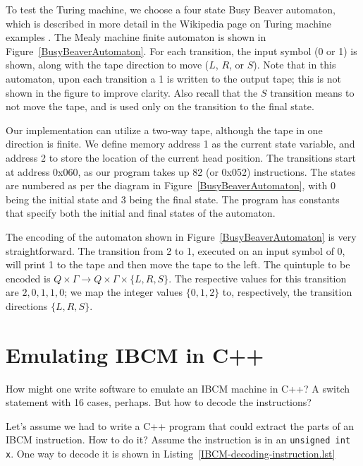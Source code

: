 To test the Turing machine, we choose a four state Busy Beaver
automaton, which is described in more detail in the Wikipedia page on
Turing machine examples \cite{wikipedia:turingmachineexamples}.  The
Mea\-ly machine finite automaton is shown in
Figure~\ref{BusyBeaverAutomaton}.  For each transition, the input
symbol (0 or 1) is shown, along with the tape direction to move ($L$,
$R$, or $S$).  Note that in this automaton, upon each transition a 1
is written to the output tape; this is not shown in the figure to
improve clarity.  Also recall that the $S$
transition means to not move the tape, and is used only on the
transition to the final state.

Our implementation can utilize a two-way tape, although the tape in
one direction is finite.  We define memory address 1 as the current
state variable, and address 2 to store the location of the current
head position.  The transitions start at address 0x060, as our program
takes up 82 (or 0x052) instructions.  The states are numbered as per
the diagram in Figure~\ref{BusyBeaverAutomaton}, with 0 being the
initial state and 3 being the final state.  The program has constants
that specify both the initial and final states of the automaton.


The encoding of the automaton shown in
Figure~\ref{BusyBeaverAutomaton} is very straightforward.  The
transition from 2 to 1, executed on an input symbol of 0, will print 1
to the tape and then move the tape to the left.  The quintuple to be
encoded is $Q \times \Gamma \rightarrow Q \times \Gamma \times
\{L,R,S\}$.  The respective values for this transition are
$2,0,1,1,0$; we map the integer values $\{0,1,2\}$ to, respectively,
the transition directions $\{L,R,S\}$.


\section{Emulating IBCM in C++}

How might one write software to emulate an IBCM machine in C++?  A
switch statement with 16 cases, perhaps.  But how to decode the
instructions?

Let's assume we had to write a C++ program that could extract the
parts of an IBCM instruction.  How to do it?  Assume the instruction
is in an {\tt unsigned int x}.  One way to decode it is shown in
Listing~\ref{IBCM-decoding-instruction.lst}



